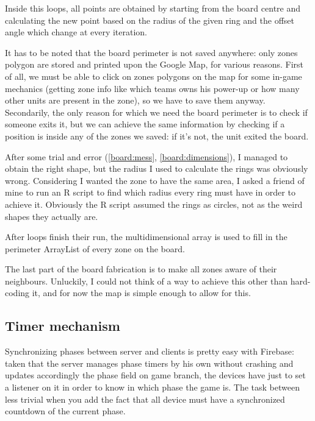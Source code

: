 			
			Inside this loops, all points are obtained by starting from the board centre and calculating the new point based on the radius of the given ring and the offset angle which change at every iteration.
			
			
			
			It has to be noted that the board perimeter is not saved anywhere: only zones polygon are stored and printed upon the Google Map, for various reasons.
			First of all, we must be able to click on zones polygons on the map for some in-game mechanics (getting zone info like which teams owns his power-up or how many other units are present in the zone), so we have to save them anyway.
			Secondarily, the only reason for which we need the board perimeter is to check if someone exits it, but we can achieve the same information by checking if a position is inside any of the zones we saved: if it's not, the unit exited the board.
			
			
			After some trial and error (\autoref{board:mess},  \autoref{board:dimensions}), I managed to obtain the right shape, but the radius I used to calculate the rings was obviously wrong.
			Considering I wanted the zone to have the same area, I asked a friend of mine to run an R script to find which radius every ring must have in order to achieve it. Obviously the R script assumed the rings as circles, not as the weird shapes they actually are.
			
			After loops finish their run, the multidimensional array is used to fill in the perimeter ArrayList of every zone on the board.
			
			The last part of the board fabrication is to make all zones aware of their neighbours. Unluckily, I could not think of a way to achieve this other than hard-coding it, and for now the map is simple enough to allow for this.
			
		\subsection{Timer mechanism}\label{focus:timer}
		
			Synchronizing phases between server and clients is pretty easy with Firebase: taken that the server manages phase timers by his own without crashing and updates accordingly the phase field on game branch, the devices have just to set a listener on it in order to know in which phase the game is.
			The task between less trivial when you add the fact that all device must have a synchronized countdown of the current phase.
			
